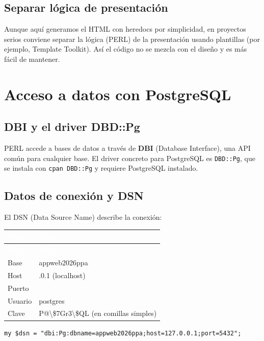 \documentclass[11pt]{article}
\begin{document}
\subsection{Separar lógica de presentación}
Aunque aquí generamos el HTML con heredocs por simplicidad, en proyectos serios conviene separar la lógica (PERL) de la presentación usando plantillas (por ejemplo, Template Toolkit). Así el código no se mezcla con el diseño y es más fácil de mantener.

\section{Acceso a datos con PostgreSQL}
\subsection{DBI y el driver DBD::Pg}
PERL accede a bases de datos a través de \textbf{DBI} (Database Interface), una API común para cualquier base. El driver concreto para PostgreSQL es \texttt{DBD::Pg}, que se instala con \texttt{cpan DBD::Pg} y requiere PostgreSQL instalado.

\subsection{Datos de conexión y DSN}
El DSN (Data Source Name) describe la conexión:

{\renewcommand{\arraystretch}{1.25}
\begin{longtable}{>{\raggedright\arraybackslash}p{3cm} >{\raggedright\arraybackslash}p{12.4cm}}
\rowcolor{uteqverde}\textcolor{white}{\textbf{Dato}} & \textcolor{white}{\textbf{Valor}} \\
\endfirsthead
\rowcolor{uteqverde}\textcolor{white}{\textbf{Dato}} & \textcolor{white}{\textbf{Valor}} \\
\endhead
\ttfamily\color{uteqverde}Base & appweb2026ppa \\ \hline
\ttfamily\color{uteqverde}Host & 127.0.0.1 (localhost) \\ \hline
\ttfamily\color{uteqverde}Puerto & 5432 \\ \hline
\ttfamily\color{uteqverde}Usuario & postgres \\ \hline
\ttfamily\color{uteqverde}Clave & P@\textbackslash{}\$7Gr3\textbackslash{}\$QL (en comillas simples) \\ \hline
\end{longtable}}
\begin{cajacodigo}
\begin{lstlisting}[style=perl]
my $dsn = "dbi:Pg:dbname=appweb2026ppa;host=127.0.0.1;port=5432";
\end{lstlisting}
\end{cajacodigo}
\vspace{2pt}
\end{document}
